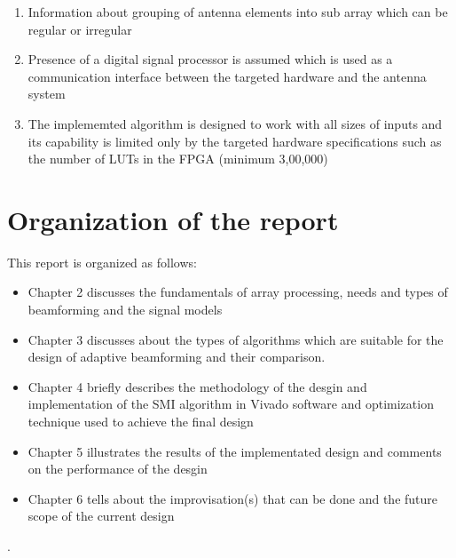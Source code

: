 \begin{enumerate}
\item Information about grouping of antenna elements into sub array which can be regular or irregular \item Presence of a digital signal processor is assumed which is used as a communication interface between the targeted hardware and the antenna system
\item The implememted algorithm is designed to work with all sizes of inputs and its capability is limited only by the targeted hardware specifications such as the number of LUTs in the FPGA (minimum 3,00,000)
\end{enumerate}

\section[Organization of the report]{\textbf{Organization of the report}}

This report is organized as follows:

\begin{itemize}
\item Chapter 2 discusses the fundamentals of array processing, needs and types of beamforming and the signal models
\item Chapter 3 discusses about the types of algorithms which are suitable for the design of adaptive beamforming and their comparison.   
\item Chapter 4 briefly describes the methodology of the desgin and implementation of the SMI algorithm in Vivado software and optimization technique used to achieve the final design
\item Chapter 5 illustrates the results of the implementated design and comments on the performance of the desgin
\item Chapter 6 tells about the improvisation(s) that can be done and the future scope of the current design
\end{itemize}

.
